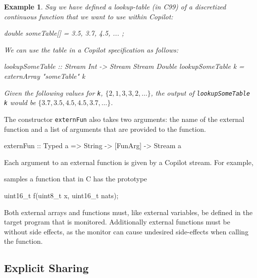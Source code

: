 \documentclass[]{article}
\theoremstyle{example}
\newtheorem{example}{Example}
\begin{document}
%
\begin{example}
Say we have defined a lookup-table (in C99) of a discretized continuous function that we want to use
within Copilot:
%
\begin{code}
double someTable[] = { 3.5, 3.7, 4.5, ... };
\end{code}
%
We can use the table in a Copilot specification as follows:
%
\begin{code}
lookupSomeTable :: Stream Int -> Stream Stream Double
lookupSomeTable k = externArray "someTable" k 
\end{code}
%
Given the following values for \texttt{k}, $\{2, 1, 3, 3, 2, \dots \}$, the output of 
\texttt{lookupSomeTable k} would be $\{3.7, 3.5, 4.5, 4.5, 3.7, \dots \}$.
\end{example}

The constructor \texttt{externFun} also takes two arguments: the name of the
external function and a list of arguments that are provided to the
function. 
%
\begin{code}
externFun :: Typed a => String -> [FunArg] -> Stream a
\end{code}
%
Each argument to an external function is given by a Copilot stream.  For
example,
%
samples a function that in C has the prototype
%
\begin{code}
uint16_t f(uint8_t x, uint16_t nats);
\end{code}
%
Both external arrays and functions must, like external variables, be defined in
the target program that is monitored. Additionally external functions must be
without side effects, as the monitor can cause undesired side-effects when
calling the function.


\subsection{Explicit Sharing}
\label{sec:explicit_sharing}
\end{document}
